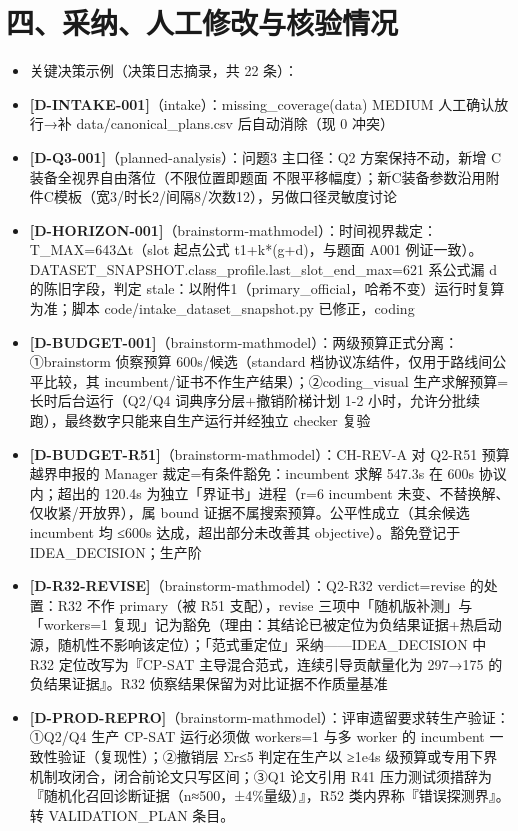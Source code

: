 \documentclass[12pt]{article}
\begin{document}
\section*{四、采纳、人工修改与核验情况}
\begin{itemize}[leftmargin=2em]
\item 关键决策示例（决策日志摘录，共 22 条）：
\item \textbf{[D-INTAKE-001]}（intake）：missing\_coverage(data) MEDIUM 人工确认放行→补 data/canonical\_plans.csv 后自动消除（现 0 冲突）
\item \textbf{[D-Q3-001]}（planned-analysis）：问题3 主口径：Q2 方案保持不动，新增 C 装备全视界自由落位（不限位置即题面 不限平移幅度）；新C装备参数沿用附件C模板（宽3/时长2/间隔8/次数12），另做口径灵敏度讨论
\item \textbf{[D-HORIZON-001]}（brainstorm-mathmodel）：时间视界裁定：T\_MAX=643Δt（slot 起点公式 t1+k*(g+d)，与题面 A001 例证一致）。DATASET\_SNAPSHOT.class\_profile.last\_slot\_end\_max=621 系公式漏 d 的陈旧字段，判定 stale：以附件1（primary\_official，哈希不变）运行时复算为准；脚本 code/intake\_dataset\_snapshot.py 已修正，coding 
\item \textbf{[D-BUDGET-001]}（brainstorm-mathmodel）：两级预算正式分离：①brainstorm 侦察预算 600s/候选（standard 档协议冻结件，仅用于路线间公平比较，其 incumbent/证书不作生产结果）；②coding\_visual 生产求解预算=长时后台运行（Q2/Q4 词典序分层+撤销阶梯计划 1-2 小时，允许分批续跑），最终数字只能来自生产运行并经独立 checker 复验
\item \textbf{[D-BUDGET-R51]}（brainstorm-mathmodel）：CH-REV-A 对 Q2-R51 预算越界申报的 Manager 裁定=有条件豁免：incumbent 求解 547.3s 在 600s 协议内；超出的 120.4s 为独立「界证书」进程（r=6 incumbent 未变、不替换解、仅收紧/开放界），属 bound 证据不属搜索预算。公平性成立（其余候选 incumbent 均 ≤600s 达成，超出部分未改善其 objective）。豁免登记于 IDEA\_DECISION；生产阶
\item \textbf{[D-R32-REVISE]}（brainstorm-mathmodel）：Q2-R32 verdict=revise 的处置：R32 不作 primary（被 R51 支配），revise 三项中「随机版补测」与「workers=1 复现」记为豁免（理由：其结论已被定位为负结果证据+热启动源，随机性不影响该定位）；「范式重定位」采纳——IDEA\_DECISION 中 R32 定位改写为『CP-SAT 主导混合范式，连续引导贡献量化为 297→175 的负结果证据』。R32 侦察结果保留为对比证据不作质量基准
\item \textbf{[D-PROD-REPRO]}（brainstorm-mathmodel）：评审遗留要求转生产验证：①Q2/Q4 生产 CP-SAT 运行必须做 workers=1 与多 worker 的 incumbent 一致性验证（复现性）；②撤销层 Σr≤5 判定在生产以 ≥1e4s 级预算或专用下界机制攻闭合，闭合前论文只写区间；③Q1 论文引用 R41 压力测试须措辞为『随机化召回诊断证据（n≈500，±4\%量级）』，R52 类内界称『错误探测界』。转 VALIDATION\_PLAN 条目。

\end{itemize}
\end{document}
